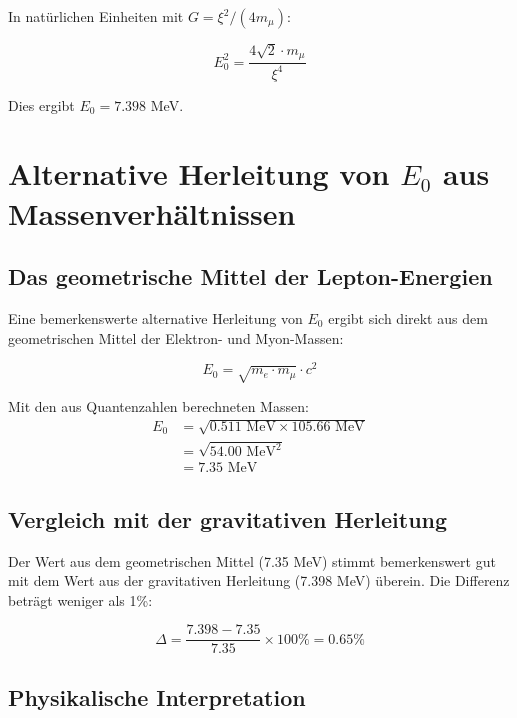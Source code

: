 \documentclass[12pt,a4paper]{article}
\theoremstyle{definition}
\begin{document}
	In nat\"urlichen Einheiten mit $G = \xi^2/(4m_\mu)$:
	
	\begin{equation}
		E_0^2 = \frac{4\sqrt{2} \cdot m_\mu}{\xi^4}
	\end{equation}
	
	Dies ergibt $E_0 = 7.398$ MeV.
	
	\section{Alternative Herleitung von $E_0$ aus Massenverh\"altnissen}
	
	\subsection{Das geometrische Mittel der Lepton-Energien}
	
	Eine bemerkenswerte alternative Herleitung von $E_0$ ergibt sich direkt aus dem geometrischen Mittel der Elektron- und Myon-Massen:
	
	\begin{equation}
		E_0 = \sqrt{m_e \cdot m_\mu} \cdot c^2
	\end{equation}
	
	Mit den aus Quantenzahlen berechneten Massen:
	\begin{align}
		E_0 &= \sqrt{0.511 \text{ MeV} \times 105.66 \text{ MeV}}\\
		&= \sqrt{54.00 \text{ MeV}^2}\\
		&= 7.35 \text{ MeV}
	\end{align}
	
	\subsection{Vergleich mit der gravitativen Herleitung}
	
	Der Wert aus dem geometrischen Mittel (7.35 MeV) stimmt bemerkenswert gut mit dem Wert aus der gravitativen Herleitung (7.398 MeV) \"uberein. Die Differenz betr\"agt weniger als 1\%:
	
	\begin{equation}
		\Delta = \frac{7.398 - 7.35}{7.35} \times 100\% = 0.65\%
	\end{equation}
	
	\subsection{Physikalische Interpretation}
	
\end{document}

